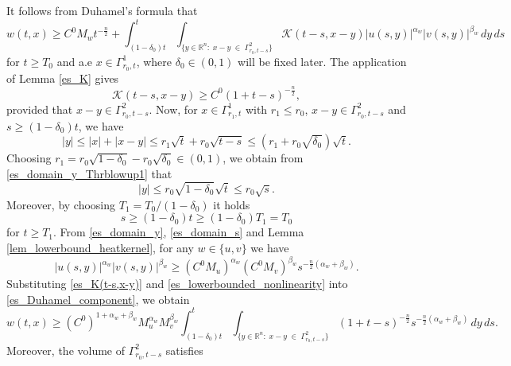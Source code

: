 \documentclass[11pt,reqno]{amsart}
\begin{document}
	\medskip
	 It follows from Duhamel's formula that 
	\begin{equation}\label{es_Duhamel_component}
		w(t,x)\geq C^0M_{w}t^{-\frac{n}{2}}+\int_{(1-\delta_0)t}^{t}\int_{\{y\in \mathbb R^n:\;x-y\;\in\;\Gamma^2_{r_0,t-s}\}}\mathcal{K}(t-s,x-y)|u(s,y)|^{\alpha_w}|v(s,y)|^{\beta_w}\,dy\,ds
	\end{equation}
	for $t\geq T_0$ and a.e $x\in\Gamma^1_{r_0,t}$, where $\delta_0\in(0,1)$ will be fixed later. The application of Lemma \ref{es_K} gives
	\begin{equation}\label{es_K(t-s,x-y)}
		\mathcal{K}(t-s,x-y)\geq C^0(1+t-s)^{-\frac{n}{2}},  
	\end{equation}
	provided that $x-y\in \Gamma^2_{r_0,t-s}$. Now, for $x\in \Gamma^1_{r_1,t}$ with $r_1\leq r_0$, $x-y\in\Gamma^2_{r_0,t-s}$ and $s\geq (1-\delta_0)t$, we have
	\begin{equation}\label{es_domain_y_Thrblowup1}
		|y|\leq |x|+|x-y|\leq r_1\sqrt{t}+r_0\sqrt{t-s}\leq (r_1+r_0\sqrt{\delta_0})\sqrt{t}. 
	\end{equation}
	Choosing $r_1=r_0\sqrt{1-\delta_0}-r_0\sqrt{\delta_0}\in(0,1)$, we obtain from \eqref{es_domain_y_Thrblowup1} that 
	\begin{equation}\label{es_domain_y}
		|y|\leq r_0\sqrt{1-\delta_0}\sqrt{t}\leq r_0\sqrt{s}.
	\end{equation}
	Moreover, by choosing $T_1=T_0/(1-\delta_0)$ it holds
	\begin{equation}\label{es_domain_s}
		s\geq (1-\delta_0)t\geq (1-\delta_0)T_1=T_0
	\end{equation}
	for $t\geq T_1$. From \eqref{es_domain_y}, \eqref{es_domain_s} and Lemma \ref{lem_lowerbound_heatkernel}, for any $w\in\{u,v\}$ we have
	\begin{equation}\label{es_lowerbounded_nonlinearity}
		|u(s,y)|^{\alpha_w}|v(s,y)|^{\beta_w}
		\geq (C^0M_u)^{\alpha_w}(C^0M_v)^{\beta_w}
		s^{-\frac n2(\alpha_w+\beta_w)}.
	\end{equation}
	Substituting \eqref{es_K(t-s,x-y)} and \eqref{es_lowerbounded_nonlinearity} into \eqref{es_Duhamel_component}, we obtain
	\begin{equation}\label{es_component_Step0}
		w(t,x)\geq (C^0)^{1+\alpha_w+\beta_w}M^{\alpha_w}_{u} M^{\beta_w}_{v}\int_{(1-\delta_0)t}^{t}\int_{\{y\in \mathbb R^n:\;x-y\;\in\;\Gamma^2_{r_0,t-s}\}}(1+t-s)^{-\frac{n}{2}}s^{-\frac{n}{2}(\alpha_w+\beta_w)}\,dy\,ds.
	\end{equation}
	Moreover, the volume of $\Gamma^2_{r_0,t-s}$ satisfies
\end{document}
